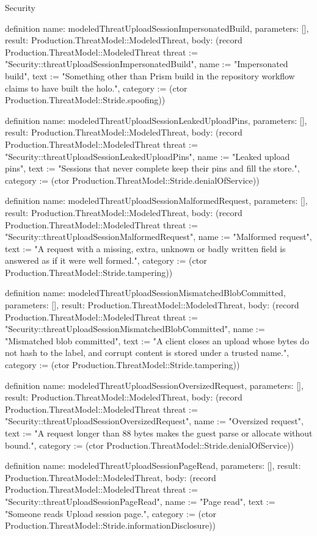 \begin{lexlean}{Security}
\begin{semanticmodule}
definition{
  name: modeledThreatUploadSessionImpersonatedBuild,
  parameters: [],
  result: Production.ThreatModel::ModeledThreat,
  body: (record Production.ThreatModel::ModeledThreat {threat := "Security::threatUploadSessionImpersonatedBuild", name := "Impersonated build", text := "Something other than Prism build in the repository workflow claims to have built the holo.", category := (ctor Production.ThreatModel::Stride.spoofing)})
}

definition{
  name: modeledThreatUploadSessionLeakedUploadPins,
  parameters: [],
  result: Production.ThreatModel::ModeledThreat,
  body: (record Production.ThreatModel::ModeledThreat {threat := "Security::threatUploadSessionLeakedUploadPins", name := "Leaked upload pins", text := "Sessions that never complete keep their pins and fill the store.", category := (ctor Production.ThreatModel::Stride.denialOfService)})
}

definition{
  name: modeledThreatUploadSessionMalformedRequest,
  parameters: [],
  result: Production.ThreatModel::ModeledThreat,
  body: (record Production.ThreatModel::ModeledThreat {threat := "Security::threatUploadSessionMalformedRequest", name := "Malformed request", text := "A request with a missing, extra, unknown or badly written field is answered as if it were well formed.", category := (ctor Production.ThreatModel::Stride.tampering)})
}

definition{
  name: modeledThreatUploadSessionMismatchedBlobCommitted,
  parameters: [],
  result: Production.ThreatModel::ModeledThreat,
  body: (record Production.ThreatModel::ModeledThreat {threat := "Security::threatUploadSessionMismatchedBlobCommitted", name := "Mismatched blob committed", text := "A client closes an upload whose bytes do not hash to the label, and corrupt content is stored under a trusted name.", category := (ctor Production.ThreatModel::Stride.tampering)})
}

definition{
  name: modeledThreatUploadSessionOversizedRequest,
  parameters: [],
  result: Production.ThreatModel::ModeledThreat,
  body: (record Production.ThreatModel::ModeledThreat {threat := "Security::threatUploadSessionOversizedRequest", name := "Oversized request", text := "A request longer than 88 bytes makes the guest parse or allocate without bound.", category := (ctor Production.ThreatModel::Stride.denialOfService)})
}

definition{
  name: modeledThreatUploadSessionPageRead,
  parameters: [],
  result: Production.ThreatModel::ModeledThreat,
  body: (record Production.ThreatModel::ModeledThreat {threat := "Security::threatUploadSessionPageRead", name := "Page read", text := "Someone reads Upload session page.", category := (ctor Production.ThreatModel::Stride.informationDisclosure)})
}


\end{semanticmodule}
\end{lexlean}
